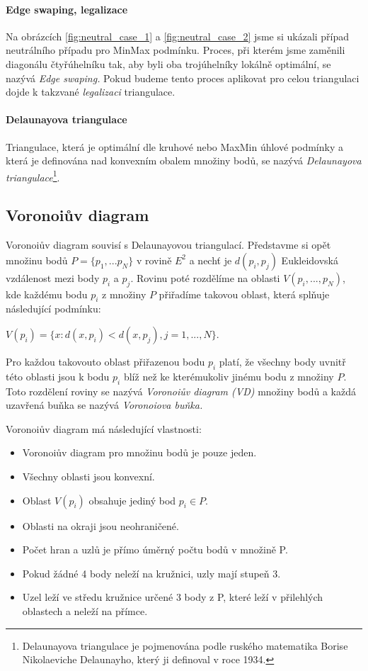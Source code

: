 \documentclass[12pt,a4paper]{article}
\begin{document}
\paragraph{Edge swaping, legalizace}

Na obrázcích \ref{fig:neutral_case_1} a \ref{fig:neutral_case_2} jsme
si ukázali případ neutrálního případu pro MinMax podmínku. Proces, při
kterém jsme zaměnili diagonálu čtyřúhelníku tak, aby byli oba
trojúhelníky lokálně optimální, se nazývá \emph{Edge swaping.} Pokud
budeme tento proces aplikovat pro celou triangulaci dojde k takzvané
\emph{legalizaci} triangulace.

\paragraph{Delaunayova triangulace}

Triangulace, která je optimální dle kruhové nebo MaxMin úhlové
podmínky a která je definována nad konvexním obalem množiny bodů, se
nazývá \emph{Delaunayova triangulace}\footnote{Delaunayova triangulace
  je pojmenována podle ruského matematika Borise Nikolaeviche
  Delaunayho\cite{Delaunay}, který ji definoval v roce 1934.}.

\newpage
\subsection{Voronoiův diagram}

Voronoiův diagram souvisí s Delaunayovou triangulací. Představme si
opět množinu bodů $P = \{p_1,...p_N\} $ v rovině $E^2$ a nechť je
$d(p_i,p_j) $ Eukleidovská vzdálenost mezi body $p_i$ a $p_j$. Rovinu
poté rozdělíme na oblasti $V(p_i,...,p_N)$, kde každému bodu $p_i$ z
množiny $P$ přiřadíme takovou oblast, která splňuje následující
podmínku:

$V(p_i) = \{ x: d(x, p_i) < d(x, p_j), j = 1,...,N\}$.

Pro každou takovouto oblast přiřazenou bodu $p_i$ platí, že
všechny body uvnitř této oblasti jsou k bodu $p_i$ blíž než ke
kterémukoliv jinému bodu z množiny $P$. Toto rozdělení roviny se
nazývá \emph{Voronoiův diagram (VD)} množiny bodů a každá uzavřená
buňka se nazývá \emph{Voronoiova buňka.}

\bigskip
Voronoiův diagram má následující vlastnosti: 
\begin{itemize}
\item Voronoiův diagram pro množinu bodů je pouze jeden.
\item Všechny oblasti jsou konvexní.
\item Oblast $V(p_i)$ obsahuje jediný bod $p_i \in P$.
\item Oblasti na okraji jsou neohraničené.
\item Počet hran a uzlů je přímo úměrný počtu bodů v množině P.
\item Pokud žádné 4 body neleží na kružnici, uzly mají stupeň 3.
\item Uzel leží ve středu kružnice určené 3 body z P, které leží v přilehlých oblastech a neleží na přímce.
\end{itemize}
\end{document}
